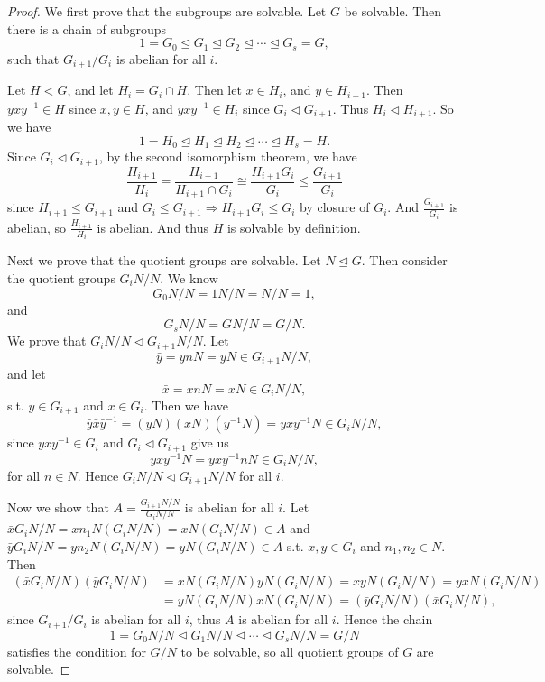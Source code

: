 \documentclass[10pt,oneside,reqno]{amsart}
\theoremstyle{plain}
\theoremstyle{definition}
\newcommand{\norm}{\trianglelefteq}
\newcommand{\propnorm}{\triangleleft}
\begin{document}
\begin{proof}
We first prove that the subgroups are solvable.
Let $G$ be solvable. Then there is a chain of subgroups
\[1 = G_0 \norm G_1 \norm G_2 \norm \cdots \norm G_s = G,\]
such that $G_{i + 1} / G_i$ is abelian for all $i$. 

Let $H < G$, and let $H_i = G_i \cap H$. Then let $x \in H_i$, and $y \in H_{i + 1}$. Then $yxy^{-1} \in H$ since $x,y \in H$, and $yxy^{-1} \in H_i$ since $G_i \propnorm G_{i  +1}$. Thus $H_i \propnorm H_{i + 1}$. So we have
\[1 = H_0 \norm H_1 \norm H_2 \norm \cdots \norm H_s = H.\]
Since $G_i \propnorm G_{i  +1}$, by the second isomorphism theorem, we have
\[\frac{H_{i + 1}}{H_i} = \frac{H_{i + 1}}{H_{i + 1} \cap G_i} \cong \frac{H_{i + 1}G_i}{G_i} \leq \frac{G_{i + 1}}{G_i}\]
since $H_{i + 1} \leq G_{i + 1}$ and $G_i \leq G_{i + 1} \Rightarrow H_{i + 1}G_i \leq G_i$ by closure of $G_i$. And $ \frac{G_{i + 1}}{G_i}$ is abelian, so $\frac{H_{i + 1}}{H_i}$ is abelian. And thus $H$ is solvable by definition. 

Next we prove that the quotient groups are solvable. Let $N \norm G$. Then consider the quotient groups $G_iN/N$. We know
 \[G_0N/N = 1N/N = N/N = 1,\]
  and 
  \[G_sN/N = GN/N = G/N.\] We prove that $G_iN/N \propnorm G_{i + 1}N/N$. Let 
  $$\bar{y} = ynN = yN \in G_{i  +1}N/N,$$
   and let 
   $$\bar{x} = xnN = xN \in G_iN/N,$$
    s.t. $y \in G_{i + 1}$ and $x \in G_i$. 
    Then we have
    $$\bar{y}\bar{x}\bar{y}^{-1} = (yN)(xN)(y^{-1}N) = yxy^{-1}N \in G_iN/N,$$ since $yxy^{-1} \in G_i$ and
    $G_i \propnorm G_{i + 1}$ give us 
    $$yxy^{-1}N = yxy^{-1}nN \in G_iN/N,$$ 
    for all $n \in N$. Hence $G_iN/N \propnorm G_{i + 1}N/N$ for all $i$.

Now we show that $A = \frac{G_{i + 1}N/N}{G_iN/N}$ is abelian for all $i$. Let $\bar{x}G_iN/N = xn_1N(G_iN/N) = xN(G_iN/N) \in A$ and $\bar{y}G_iN/N = yn_2N(G_iN/N) = yN(G_iN/N) \in A$ s.t. $x,y \in G_i$ and $n_1,n_2 \in N$. Then 
\begin{equation}
\begin{aligned}(\bar{x}G_iN/N)(\bar{y}G_iN/N) &= xN(G_iN/N)yN(G_iN/N) = xyN(G_iN/N) = yxN(G_iN/N)\\
 &= yN(G_iN/N)xN(G_iN/N) = (\bar{y}G_iN/N)(\bar{x}G_iN/N),
\end{aligned}
\end{equation}
since $G_{i + 1}/G_i$ is abelian for all $i$, thus $A$ is abelian for all $i$. Hence the chain 
\[1 = G_0N/N \norm G_1N/N \norm \cdots \norm G_sN/N = G/N\]
satisfies the condition for $G/N$ to be solvable, so all quotient groups of $G$ are solvable. 
\end{proof}
\end{document}
